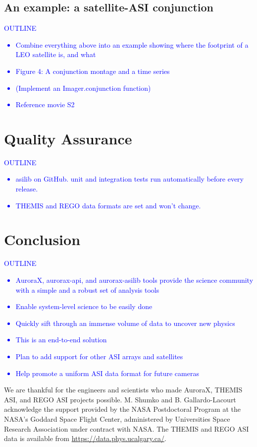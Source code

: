 \documentclass[draft]{agujournal2019}
\begin{document}
\subsection{An example: a satellite-ASI conjunction}
\textcolor{blue}{
      OUTLINE
      \begin{itemize}
            \item Combine everything above into an example showing where the footprint of a LEO satellite is, and what 
            \item Figure 4: A conjunction montage and a time series
            \item (Implement an Imager.conjunction function)
            \item Reference movie S2
      \end{itemize}
}

\section{Quality Assurance}
\textcolor{blue}{
      OUTLINE
      \begin{itemize}
            \item asilib on GitHub. unit and integration tests run automatically before every release.
            \item THEMIS and REGO data formats are set and won't change.
      \end{itemize}
}

\section{Conclusion}

\textcolor{blue}{
      OUTLINE
      \begin{itemize}
            \item AuroraX, aurorax-api, and aurorax-asilib tools provide the science community with a simple and a robust set of analysis tools
            \item Enable system-level science to be easily done
            \item Quickly sift through an immense volume of data to uncover new physics
            \item This is an end-to-end solution
            \item Plan to add support for other ASI arrays and satellites
            \item Help promote a uniform ASI data format for future cameras
      \end{itemize}
}

\acknowledgments
We are thankful for the engineers and scientists who made AuroraX, THEMIS ASI, and REGO ASI projects possible. M. Shumko and B. Gallardo-Lacourt acknowledge the support provided by the NASA Postdoctoral Program at the NASA’s Goddard Space Flight Center, administered by Universities Space Research Association under contract with NASA. The THEMIS and REGO ASI data is available from \url{https://data.phys.ucalgary.ca/}.

% 
\end{document}
